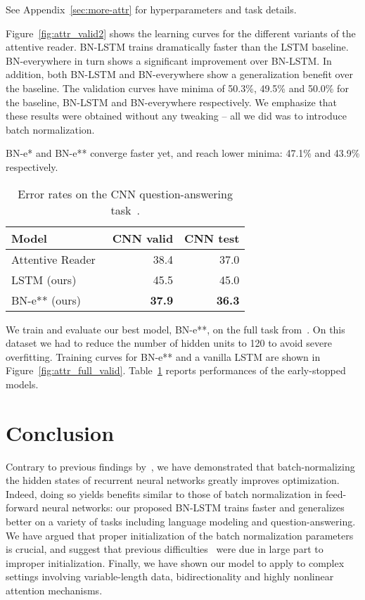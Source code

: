 \documentclass{article} \pdfoutput=1 \usepackage[utf8]{inputenc}
\begin{document}
See Appendix~\ref{sec:more-attr} for hyperparameters and task details.

Figure~\ref{fig:attr_valid2} shows the learning curves for the different
variants of the attentive reader.  BN-LSTM trains dramatically faster than the
LSTM baseline.  BN-everywhere in turn shows a significant improvement over
BN-LSTM.  In addition, both BN-LSTM and BN-everywhere show a generalization
benefit over the baseline.  The validation curves have minima of 50.3\%, 49.5\%
and 50.0\% for the baseline, BN-LSTM and BN-everywhere respectively.  We
emphasize that these results were obtained without any tweaking -- all we did
was to introduce batch normalization.

BN-e* and BN-e** converge faster yet, and reach lower minima: 47.1\% and 43.9\%
respectively.

\begin{table}[!hb]
  \center
  \begin{tabular}{@{}lrr@{}}
  \toprule
  \bf Model & \bf CNN valid & \bf CNN test \\
  \midrule
  Attentive Reader~\citep{attentivereader} & 38.4 & 37.0 \\
  \midrule
  LSTM (ours) & 45.5 & 45.0 \\
  BN-e** (ours) & \textbf{37.9} & \textbf{36.3} \\
  \bottomrule
\end{tabular}
\caption{Error rates on the CNN question-answering task~\citet{attentivereader}.}
\label{tab:attr_full}
\end{table}

We train and evaluate our best model, BN-e**, on the full task from~\citep{attentivereader}.
On this dataset we had to reduce the number of hidden units to 120 to avoid severe overfitting.
Training curves for BN-e** and a vanilla LSTM are shown in Figure~\ref{fig:attr_full_valid}.
Table~\ref{tab:attr_full} reports performances of the early-stopped models.

\section{Conclusion}

Contrary to previous findings by~\citet{cesar,baidu}, we have demonstrated that
batch-normalizing the hidden states of recurrent neural networks greatly
improves optimization.  Indeed, doing so yields benefits similar to those of
batch normalization in feed-forward neural networks: our proposed BN-LSTM
trains faster and generalizes better on a variety of tasks including language
modeling and question-answering.  We have argued that proper initialization of
the batch normalization parameters is crucial, and suggest that previous
difficulties~\citep{cesar, baidu} were due in large part to improper
initialization.  Finally, we have shown our model to apply to complex settings
involving variable-length data, bidirectionality and highly nonlinear attention
mechanisms.
\end{document}
